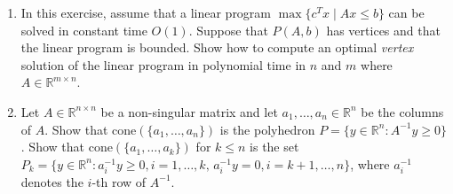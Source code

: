 \documentclass[11pt]{article}
\newcommand{\setR}{\mathbb{R}}
\renewcommand{\leq}{\leqslant}
\renewcommand{\geq}{\geqslant}
\newcommand{\cone}{\mathrm{cone}}
\begin{document}
\begin{enumerate}[1)]



\item In this exercise, assume that a linear program $\max\{c^Tx \mid
  Ax\leq b \}$ can be solved in constant time $O(1)$. Suppose that $P(A,b)$
  has vertices and that the linear program is bounded. Show how to
  compute an optimal \emph{vertex} solution of the linear
  program in polynomial time in $n$ and $m$ where $A \in \mathbb{R}^{m \times n}$. 
  
\item Let $A \in \setR^{n\times n}$ be a non-singular matrix and let
  $a_1,\ldots,a_n\in \setR^n$ be the columns of $A$.  Show that
  $\cone(\{a_1,\ldots,a_n\})$ is the polyhedron $P = \{ y \in \setR^n \colon
  A^{-1} y\geq0\}$. \label{conv:item:3} Show that $\cone(\{a_1,\ldots,a_k\})$ for
  $k\leq n$ is the set $P_k = \{y \in \setR^n \colon
  a_i^{-1} y\geq0, i=1,\ldots,k, \, a_i^{-1}y = 0, i=k+1,\ldots,n\}$, where
  $a_i^{-1}$ denotes the $i$-th row of $A^{-1}$. 
  
  


\end{enumerate}



  
\end{document}
